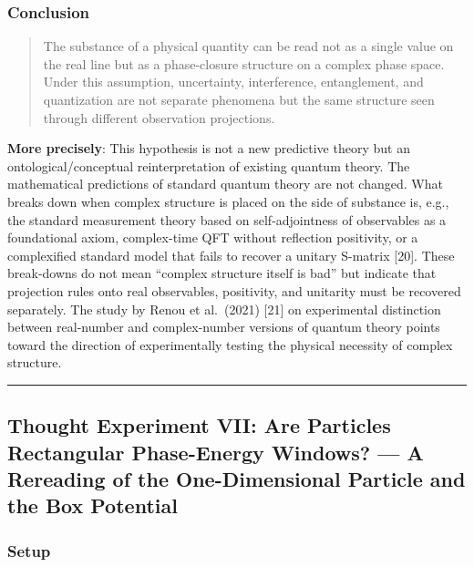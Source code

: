 \documentclass[
]{article}
\begin{document}
\subsubsection{Conclusion}\label{conclusion-5}

\begin{quote}
The substance of a physical quantity can be read not as a single value
on the real line but as a phase-closure structure on a complex phase
space. Under this assumption, uncertainty, interference, entanglement,
and quantization are not separate phenomena but the same structure seen
through different observation projections.
\end{quote}

\textbf{More precisely}: This hypothesis is not a new predictive theory
but an ontological/conceptual reinterpretation of existing quantum
theory. The mathematical predictions of standard quantum theory are not
changed. What breaks down when complex structure is placed on the side
of substance is, e.g., the standard measurement theory based on
self-adjointness of observables as a foundational axiom, complex-time
QFT without reflection positivity, or a complexified standard model that
fails to recover a unitary S-matrix {[}20{]}. These break-downs do not
mean ``complex structure itself is bad'' but indicate that projection
rules onto real observables, positivity, and unitarity must be recovered
separately. The study by Renou et al.~(2021) {[}21{]} on experimental
distinction between real-number and complex-number versions of quantum
theory points toward the direction of experimentally testing the
physical necessity of complex structure.

\begin{center}\rule{0.5\linewidth}{0.5pt}\end{center}

\subsection{Thought Experiment VII: Are Particles Rectangular
Phase-Energy Windows? --- A Rereading of the One-Dimensional Particle
and the Box
Potential}\label{thought-experiment-vii-are-particles-rectangular-phase-energy-windows-a-rereading-of-the-one-dimensional-particle-and-the-box-potential}

\subsubsection{Setup}\label{setup-6}
\end{document}

